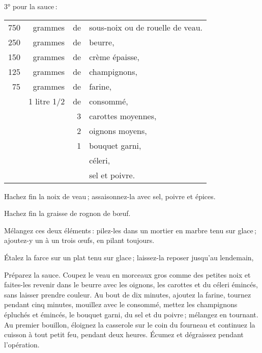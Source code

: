 3° pour la sauce :

\medskip

\footnotesize
\begin{longtable}{rrrp{16em}}
    750 & grammes & de & sous-noix ou de rouelle de veau.                                                 \\
    250 & grammes & de & beurre,                                                                          \\
    150 & grammes & de & crème épaisse,                                                                   \\
    125 & grammes & de & champignons,                                                                     \\
     75 & grammes & de & farine,                                                                          \\
    & 1 litre 1/2 & de & consommé,                                                                        \\
        &         &  3 & carottes moyennes,                                                               \\
        &         &  2 & oignons moyens,                                                                  \\
        &         &  1 & bouquet garni,                                                                   \\
        &         &    & céleri,                                                                          \\
        &         &    & sel et poivre.                                                                   \\
\end{longtable}
\normalsize

Hachez fin la noix de veau ; assaisonnez-la avec sel, poivre et épices.

Hachez fin la graisse de rognon de bœuf.

Mélangez ces deux éléments : pilez-les dans un mortier en marbre tenu sur
glace ; ajoutez-y un à un trois œufs, en pilant toujours.

Étalez la farce sur un plat tenu sur glace ; laissez-la reposer jusqu'au
lendemain,

Préparez la sauce. Coupez le veau en morceaux gros comme des petites noix et
faites-les revenir dans le beurre avec les oignons, les carottes et du céleri
émincés, sans laisser prendre couleur. Au bout de dix minutes, ajoutez la
farine, tournez pendant cinq minutes, mouillez avec le consommé, mettez les
champignons épluchés et émincés, le bouquet garni, du sel et du poivre ;
mélangez en tournant. Au premier bouillon, éloignez la casserole sur le coin du
fourneau et continuez la cuisson à tout petit feu, pendant deux heures. Écumez
et dégraissez pendant l'opération.

